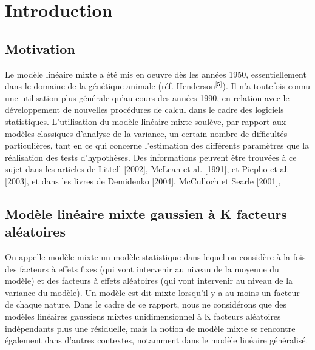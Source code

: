 \documentclass[11pt,fleqn]{book} %
\begin{document}
	
	
	\chapter{Introduction}
	
	\section{Motivation}
	
	\vspace{1em}
	
	Le modèle linéaire mixte a été mis en oeuvre dès les années 1950, essentiellement dans
	le domaine de la génétique animale (réf.       Henderson$^{\textbf{[5]}}$). Il n’a toutefois
	connu une utilisation plus générale qu’au cours des années 1990, en relation avec le
	développement de nouvelles procédures de calcul dans le cadre des logiciels statistiques. L’utilisation du modèle linéaire mixte soulève, par rapport aux modèles classiques d’analyse de la variance, un certain nombre de difficultés particulières, tant en ce qui concerne l’estimation des différents paramètres que la réalisation des tests d’hypothèses. Des informations peuvent être trouvées à ce sujet
	dans les articles de Littell [2002], McLean et al. [1991], et Piepho et al. [2003], et dans les
	livres de Demidenko [2004], McCulloch et Searle [2001], 
	
	\vspace{2em}
	
	\section{Modèle linéaire mixte gaussien à K facteurs aléatoires}
	
	\vspace{1em}
	
	On appelle modèle mixte un modèle statistique dans lequel on considère à la fois des facteurs à effets fixes (qui vont intervenir au niveau de la moyenne du modèle) et des facteurs à effets aléatoires (qui vont intervenir au niveau de la variance du modèle). Un modèle est dit mixte lorsqu’il y a au moins un facteur de chaque nature. Dans le cadre de ce rapport, nous ne considérons
	que des modèles linéaires gaussiens mixtes unidimensionnel à K facteurs aléatoires indépendants plus une résiduelle, mais la notion de modèle mixte se rencontre également dans d’autres contextes, notamment dans le modèle linéaire généralisé.
	
\end{document}
